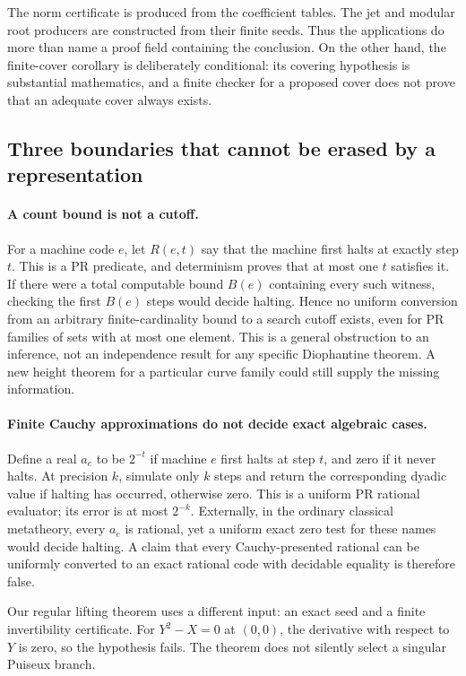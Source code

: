 The norm certificate is produced from the coefficient tables. The jet and
modular root producers are constructed from their finite seeds. Thus the
applications do more than name a proof field containing the conclusion.
On the other hand, the finite-cover corollary is deliberately conditional:
its covering hypothesis is substantial mathematics, and a finite checker
for a proposed cover does not prove that an adequate cover always exists.

\subsection{Three boundaries that cannot be erased by a representation}

\paragraph{A count bound is not a cutoff.}
For a machine code \(e\), let \(R(e,t)\) say that the machine first halts
at exactly step \(t\). This is a PR predicate, and determinism proves
that at most one \(t\) satisfies it. If there were a total computable
bound \(B(e)\) containing every such witness, checking the first
\(B(e)\) steps would decide halting. Hence no uniform conversion from
an arbitrary finite-cardinality bound to a search cutoff exists, even
for PR families of sets with at most one element. This is a general
obstruction to an inference, not an independence result for any specific
Diophantine theorem. A new height theorem for a particular curve family
could still supply the missing information.

\paragraph{Finite Cauchy approximations do not decide exact algebraic cases.}
Define a real \(a_e\) to be \(2^{-t}\) if machine \(e\) first halts
at step \(t\), and zero if it never halts. At precision \(k\), simulate
only \(k\) steps and return the corresponding dyadic value if halting
has occurred, otherwise zero. This is a uniform PR rational evaluator;
its error is at most \(2^{-k}\). Externally, in the ordinary classical metatheory, every \(a_e\) is rational, yet a
uniform exact zero test for these names would decide halting. A claim
that every Cauchy-presented rational can be uniformly converted to an
exact rational code with decidable equality is therefore false.

Our regular lifting theorem uses a different input: an exact seed and
a finite invertibility certificate. For \(Y^2-X=0\) at \((0,0)\),
the derivative with respect to \(Y\) is zero, so the hypothesis fails.
The theorem does not silently select a singular Puiseux branch.

